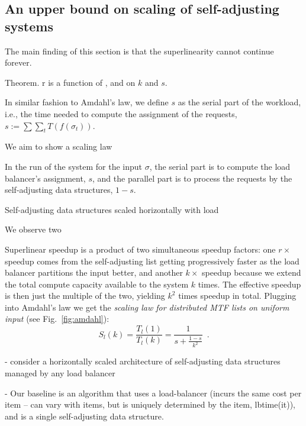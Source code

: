 \subsection{An upper bound on scaling of self-adjusting systems}


The main finding of this section is that the superlinearity cannot continue forever.


Theorem. r is a function of , and on $k$ and $s$.

In similar fashion to Amdahl's law, we define $s$ as the serial part of the workload, i.e., the time needed to compute the assignment of the requests, $s := \sum \sum_t T(f(\sigma_t))$.

We aim to show a scaling law 



In the run of the system for the input $\sigma$, the serial part is to compute the load balancer's assignment, $s$, and the parallel part is to process the requests by the self-adjusting data structures, $1-s$.






Self-adjusting data structures scaled horizontally with load 



We observe two 



Superlinear speedup is a product of two simultaneous speedup factors: one $r\times$ speedup comes from the self-adjusting list getting progressively faster as the load balancer partitions the input better, and another $k\times$ speedup because we extend the total compute capacity available to the system $k$ times. The effective speedup is then just the multiple of the two, yielding $k^2$ times speedup in total. Plugging into Amdahl's law we get the \emph{scaling law for distributed MTF lists on uniform input} (see Fig.~\ref{fig:amdahl}):
\begin{equation}\label{eq:mtf-perf}
  S_l(k) = \frac{T_l(1)}{T_l(k)} = \frac1{s + \frac{1-s}{k^2}} \enspace .
\end{equation}






- consider a horizontally scaled architecture of self-adjusting data structures managed by any load balancer

- Our baseline is an algorithm that uses a load-balancer (incurs the same cost per item -- can vary with items, but is uniquely determined by the item, lbtime(it)), and is a single self-adjusting data structure.

